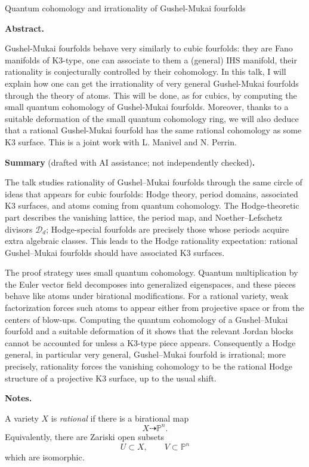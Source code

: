 Quantum cohomology and irrationality
of Gushel-Mukai fourfolds

\medskip\noindent
{\bf Abstract.}

Gushel-Mukai fourfolds behave very
similarly to cubic fourfolds: they are
Fano manifolds of K3-type, one can
associate to them a (general) IHS
manifold, their rationality is
conjecturally controlled by their
cohomology. In this talk, I will
explain how one can get the
irrationality of very general
Gushel-Mukai fourfolds through the
theory of atoms. This will be done,
as for cubics, by computing the small
quantum cohomology of Gushel-Mukai
fourfolds. Moreover, thanks to a
suitable deformation of the small
quantum cohomology ring, we will also
deduce that a rational Gushel-Mukai
fourfold has the same rational
cohomology as some K3 surface. This
is a joint work with L. Manivel and
N. Perrin.

\medskip\noindent
{\bf Summary} (drafted with AI assistance;
not independently checked){\bf .}

The talk studies rationality of
Gushel--Mukai fourfolds through the
same circle of ideas that appears for
cubic fourfolds: Hodge theory, period
domains, associated K3 surfaces, and
atoms coming from quantum cohomology.
The Hodge-theoretic part describes the
vanishing lattice, the period map, and
Noether--Lefschetz divisors
$\mathcal D_d$; Hodge-special
fourfolds are precisely those whose
periods acquire extra algebraic
classes. This leads to the Hodge
rationality expectation: rational
Gushel--Mukai fourfolds should have
associated K3 surfaces.

The proof strategy uses small quantum
cohomology. Quantum multiplication by
the Euler vector field decomposes into
generalized eigenspaces, and these
pieces behave like atoms under
birational modifications. For a
rational variety, weak factorization
forces such atoms to appear either
from projective space or from the
centers of blow-ups. Computing the
quantum cohomology of a
Gushel--Mukai fourfold and a suitable
deformation of it shows that the
relevant Jordan blocks cannot be
accounted for unless a K3-type piece
appears. Consequently a Hodge general,
in particular very general,
Gushel--Mukai fourfold is irrational;
more precisely, rationality forces
the vanishing cohomology to be the
rational Hodge structure of a
projective K3 surface, up to the
usual shift.

\medskip\noindent
{\bf Notes.}

\begin{definition}
\label{definition-variety-x}
A variety $X$ is {\it rational} if
there is a birational map
\[
        X\dashrightarrow \mathbb{P}^n.
\]
Equivalently, there are Zariski open
subsets
\[
        U\subset X,
        \qquad
        V\subset \mathbb{P}^n
\]
which are isomorphic.
\end{definition}

